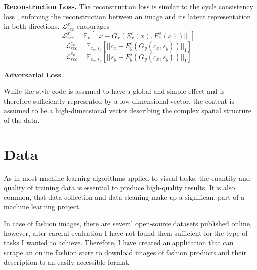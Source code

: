 \documentclass{article}
\begin{document}
\textbf{Reconstruction Loss.}
The reconstruction loss is similar to the cycle consistency loss \cite{zhu_unpaired_2017}, enforcing the reconstruction between an image and its latent representation in both directions. $\mathcal{L}^{x}_{rec}$ encourages 
\begin{equation}
\mathcal{L}^{x}_{rec} = \mathbb{E}_{x}[||x - G_{x}(E^{c}_{x}(x), E^{s}_{x}(x))||_{1}]
\end{equation}
\begin{equation}
\mathcal{L}^{c_{x}}_{rec} = \mathbb{E}_{c_{x}, s_{y}}[||c_{x} - E^{c}_{y}(G_{y}(c_{x},s_{y}))||_{1}]
\end{equation}
\begin{equation}
\mathcal{L}^{s_{y}}_{rec} = \mathbb{E}_{c_{x}, s_{y}}[||s_{y} - E^{s}_{y}(G_{y}(c_{x},s_{y}))||_{1}]
\end{equation}


\textbf{Adversarial Loss.}




While the style code is assumed to have a global and simple effect and is therefore sufficiently represented by a low-dimensional vector, the content is assumed to be a high-dimensional vector describing the complex spatial structure of the data.





\section{Data}
As in most machine learning algorithms applied to visual tasks, the quantity and quality of training data is essential to produce high-quality results. It is also common, that data collection and data cleaning make up a significant part of a machine learning project.

In case of fashion images, there are several open-source datasets published online, however, after careful evaluation I have not found them sufficient for the type of tasks I wanted to achieve. Therefore, I have created an application that can scrape an online fashion store to download images of fashion products and their description to an easily-accessible format.

\end{document}
